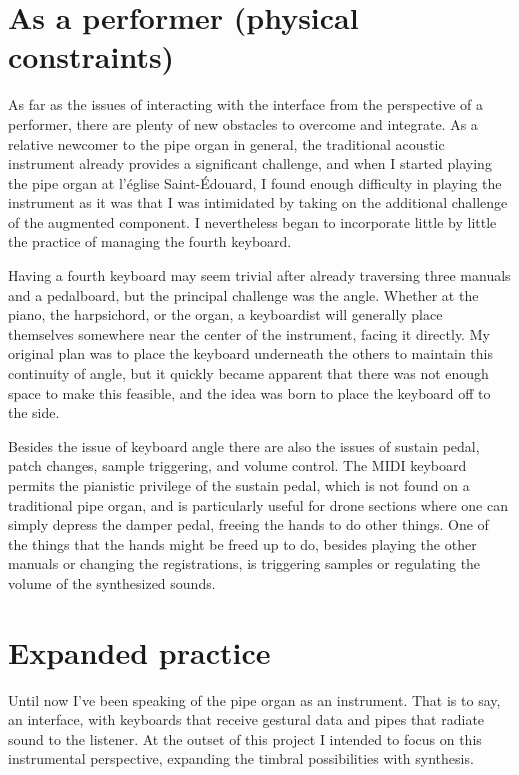 \documentclass[12pt,twoside,maitrise]{dms_ks}
\theoremstyle{definition}
\begin{document}
{\section{As a performer (physical constraints)}

As far as the issues of interacting with the interface from the perspective of a performer, there are plenty of new obstacles to overcome and integrate. 
As a relative newcomer to the pipe organ in general, the traditional acoustic instrument already provides a significant challenge, and when I started playing the pipe organ at l’église Saint-Édouard, I found enough difficulty in playing the instrument as it was that I was intimidated by taking on the additional challenge of the augmented component. 
I nevertheless began to incorporate little by little the practice of managing the fourth keyboard. 

Having a fourth keyboard may seem trivial after already traversing three manuals and a pedalboard, but the principal challenge was the angle. 
Whether at the piano, the harpsichord, or the organ, a keyboardist will generally place themselves somewhere near the center of the instrument, facing it directly. 
My original plan was to place the keyboard underneath the others to maintain this continuity of angle, but it quickly became apparent that there was not enough space to make this feasible, and the idea was born to place the keyboard off to the side. 

Besides the issue of keyboard angle there are also the issues of sustain pedal, patch changes, sample triggering, and volume control. 
The MIDI keyboard permits the pianistic privilege of the sustain pedal, which is not found on a traditional pipe organ, and is particularly useful for drone sections where one can simply depress the damper pedal, freeing the hands to do other things. 
One of the things that the hands might be freed up to do, besides playing the other manuals or changing the registrations, is triggering samples or regulating the volume of the synthesized sounds. 

\section{Expanded practice}

Until now I've been speaking of the pipe organ as an instrument. 
That is to say, an interface, with keyboards that receive gestural data and pipes that radiate sound to the listener. 
At the outset of this project I intended to focus on this instrumental perspective, expanding the timbral possibilities with synthesis.

}
\end{document}
